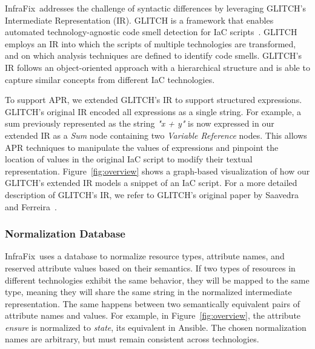 \documentclass[sigconf,nonacm]{acmart}
\def\name{{\sc InfraFix}}
\begin{document}
\name\ addresses the challenge of syntactic differences by leveraging GLITCH's Intermediate Representation (IR).
GLITCH is a framework that enables automated technology-agnostic code smell detection for IaC scripts~\cite{saavedra2022glitch,saavedra2023polyglot}.
GLITCH employs an IR into which the scripts of multiple technologies are transformed, and on which analysis techniques are defined to identify code smells.
GLITCH's IR follows an object-oriented approach with a hierarchical structure and is able to capture similar concepts from different IaC technologies. 

To support APR, we extended GLITCH's IR to support structured expressions. GLITCH's original IR encoded all expressions as a single string. For example, a sum previously represented as the string \emph{"x + y"} is now expressed in our extended IR as a \emph{Sum} node containing two \emph{Variable Reference} nodes. This allows APR techniques to manipulate the values of expressions and pinpoint the location of values in the original IaC script to modify their textual representation. Figure~\ref{fig:overview} shows a graph-based visualization of how our GLITCH's extended IR models a snippet of an IaC script. For a more detailed description of GLITCH's IR, we refer to GLITCH's original paper by Saavedra and Ferreira~\cite{saavedra2022glitch}.

\subsubsection{Normalization Database}

\name\ uses a database to normalize resource types, attribute names, and reserved attribute values based on their semantics. 
If two types of resources in different technologies exhibit the same behavior, they will be mapped to the same type, meaning they will share the same string in the normalized intermediate representation.
The same happens between two semantically equivalent pairs of attribute names and values. For example, in Figure~\ref{fig:overview}, the attribute \emph{ensure} is normalized to \emph{state}, its equivalent in Ansible. The chosen normalization names are arbitrary, but must remain consistent across technologies.
\end{document}
